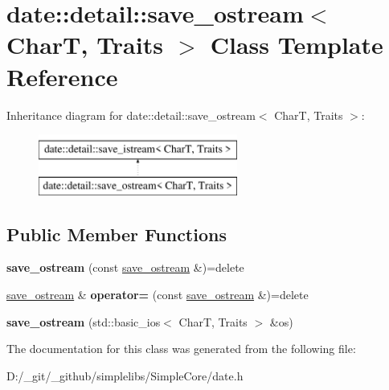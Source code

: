 \hypertarget{classdate_1_1detail_1_1save__ostream}{}\section{date\+::detail\+::save\+\_\+ostream$<$ CharT, Traits $>$ Class Template Reference}
\label{classdate_1_1detail_1_1save__ostream}
Inheritance diagram for date\+::detail\+::save\+\_\+ostream$<$ CharT, Traits $>$\+:\begin{figure}[H]
\begin{center}
\leavevmode
\includegraphics[height=2.000000cm]{classdate_1_1detail_1_1save__ostream}
\end{center}
\end{figure}
\subsection*{Public Member Functions}
\begin{DoxyCompactItemize}
\item 
\mbox{\label{classdate_1_1detail_1_1save__ostream_a6d450b6dbfb79b801f498e8c739a73ed}} 
{\bfseries save\+\_\+ostream} (const \mbox{\hyperlink{classdate_1_1detail_1_1save__ostream}{save\+\_\+ostream}} \&)=delete
\item 
\mbox{\label{classdate_1_1detail_1_1save__ostream_ae2b44d70e7ec95d9c3f0acf31646aee4}} 
\mbox{\hyperlink{classdate_1_1detail_1_1save__ostream}{save\+\_\+ostream}} \& {\bfseries operator=} (const \mbox{\hyperlink{classdate_1_1detail_1_1save__ostream}{save\+\_\+ostream}} \&)=delete
\item 
\mbox{\label{classdate_1_1detail_1_1save__ostream_a9857f86afea9342c952b4ce728df92cd}} 
{\bfseries save\+\_\+ostream} (std\+::basic\+\_\+ios$<$ CharT, Traits $>$ \&os)
\end{DoxyCompactItemize}


The documentation for this class was generated from the following file\+:\begin{DoxyCompactItemize}
\item 
D\+:/\+\_\+git/\+\_\+github/simplelibs/\+Simple\+Core/date.\+h\end{DoxyCompactItemize}
